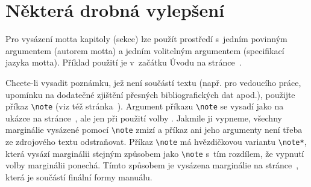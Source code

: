 
\chapter{Některá drobná vylepšení}\label{improv}%

Pro vysázení motta kapitoly (sekce) lze použít prostředí  s~jedním
povinným argumentem (autorem motta) a jedním volitelným argumentem
(specifikací jazyka motta). Příklad použití je v~začátku Úvodu na
stránce~\pageref{intro}.

Chcete-li vysadit poznámku, jež není součástí textu (např. pro vedoucího
práce, upomínku na dodatečné zjištění přesných bibliografických dat apod.),
použijte příkaz \verb!\note! (viz též stránka~\pageref{opdraft}). Argument
příkazu \verb!\note! se vysadí jako na ukázce na stránce~\pageref{opdraft},
ale jen při použití volby . Jakmile ji vypneme, všechny marginálie
vysázené pomocí \verb!\note! zmizí a příkaz ani jeho argumenty není třeba ze
zdrojového textu odstraňovat. Příkaz \verb!\note! má hvězdičkovou variantu
\verb!\note*!, která vysází marginálii stejným způsobem jako \verb!\note!
s~tím rozdílem, že vypnutí volby  marginálii ponechá. Tímto
způsobem je vysázena marginálie na stránce~\pageref{opdraft}, která je
součástí finální formy manuálu.

\endinput

\section{Fragmentace zdrojového kódu}\label{fragment}%

\section{Základy vytváření tabulek}\label{tables}%

\section{Tvorba rejstříku}\label{treatindex}%

